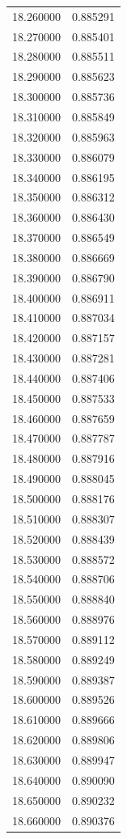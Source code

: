 \begin{tabular}{rr}
18.260000 & 0.885291 \\
18.270000 & 0.885401 \\
18.280000 & 0.885511 \\
18.290000 & 0.885623 \\
18.300000 & 0.885736 \\
18.310000 & 0.885849 \\
18.320000 & 0.885963 \\
18.330000 & 0.886079 \\
18.340000 & 0.886195 \\
18.350000 & 0.886312 \\
18.360000 & 0.886430 \\
18.370000 & 0.886549 \\
18.380000 & 0.886669 \\
18.390000 & 0.886790 \\
18.400000 & 0.886911 \\
18.410000 & 0.887034 \\
18.420000 & 0.887157 \\
18.430000 & 0.887281 \\
18.440000 & 0.887406 \\
18.450000 & 0.887533 \\
18.460000 & 0.887659 \\
18.470000 & 0.887787 \\
18.480000 & 0.887916 \\
18.490000 & 0.888045 \\
18.500000 & 0.888176 \\
18.510000 & 0.888307 \\
18.520000 & 0.888439 \\
18.530000 & 0.888572 \\
18.540000 & 0.888706 \\
18.550000 & 0.888840 \\
18.560000 & 0.888976 \\
18.570000 & 0.889112 \\
18.580000 & 0.889249 \\
18.590000 & 0.889387 \\
18.600000 & 0.889526 \\
18.610000 & 0.889666 \\
18.620000 & 0.889806 \\
18.630000 & 0.889947 \\
18.640000 & 0.890090 \\
18.650000 & 0.890232 \\
18.660000 & 0.890376 \\

\end{tabular}
